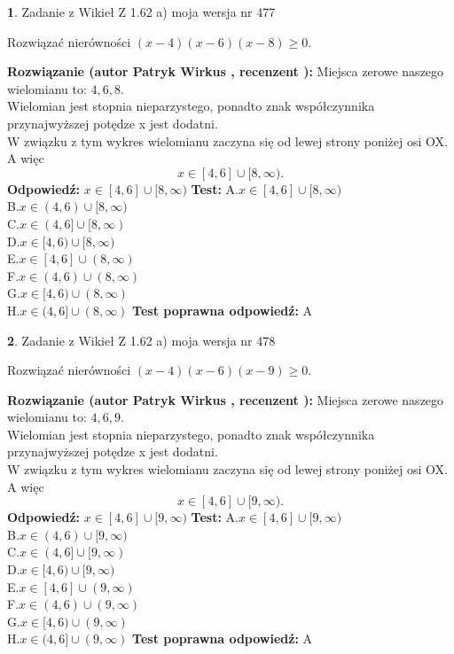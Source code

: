 \documentclass[12pt, a4paper]{article}
\theoremstyle{definition} %
\newtheorem{zad}{}
\newcommand{\zadStart}[1]{\begin{zad}#1\newline}
\newcommand{\zadStop}{\end{zad}}
\newcommand{\rozwStart}[2]{\noindent \textbf{Rozwiązanie (autor #1 , recenzent #2): }\newline}
\newcommand{\rozwStop}{\newline}
\newcommand{\odpStart}{\noindent \textbf{Odpowiedź:}\newline}
\newcommand{\odpStop}{\newline}
\newcommand{\testStart}{\noindent \textbf{Test:}\newline}
\newcommand{\testStop}{\newline}
\newcommand{\kluczStart}{\noindent \textbf{Test poprawna odpowiedź:}\newline}
\newcommand{\kluczStop}{\newline}
\begin{document}
\zadStart{Zadanie z Wikieł Z 1.62 a) moja wersja nr 477}

Rozwiązać nierówności $(x-4)(x-6)(x-8)\ge0$.
\zadStop
\rozwStart{Patryk Wirkus}{}
Miejsca zerowe naszego wielomianu to: $4, 6, 8$.\\
Wielomian jest stopnia nieparzystego, ponadto znak współczynnika przy\linebreak najwyższej potędze x jest dodatni.\\ W związku z tym wykres wielomianu zaczyna się od lewej strony poniżej osi OX. A więc $$x \in [4,6] \cup [8,\infty).$$
\rozwStop
\odpStart
$x \in [4,6] \cup [8,\infty)$
\odpStop
\testStart
A.$x \in [4,6] \cup [8,\infty)$\\
B.$x \in (4,6) \cup [8,\infty)$\\
C.$x \in (4,6] \cup [8,\infty)$\\
D.$x \in [4,6) \cup [8,\infty)$\\
E.$x \in [4,6] \cup (8,\infty)$\\
F.$x \in (4,6) \cup (8,\infty)$\\
G.$x \in [4,6) \cup (8,\infty)$\\
H.$x \in (4,6] \cup (8,\infty)$
\testStop
\kluczStart
A
\kluczStop



\zadStart{Zadanie z Wikieł Z 1.62 a) moja wersja nr 478}

Rozwiązać nierówności $(x-4)(x-6)(x-9)\ge0$.
\zadStop
\rozwStart{Patryk Wirkus}{}
Miejsca zerowe naszego wielomianu to: $4, 6, 9$.\\
Wielomian jest stopnia nieparzystego, ponadto znak współczynnika przy\linebreak najwyższej potędze x jest dodatni.\\ W związku z tym wykres wielomianu zaczyna się od lewej strony poniżej osi OX. A więc $$x \in [4,6] \cup [9,\infty).$$
\rozwStop
\odpStart
$x \in [4,6] \cup [9,\infty)$
\odpStop
\testStart
A.$x \in [4,6] \cup [9,\infty)$\\
B.$x \in (4,6) \cup [9,\infty)$\\
C.$x \in (4,6] \cup [9,\infty)$\\
D.$x \in [4,6) \cup [9,\infty)$\\
E.$x \in [4,6] \cup (9,\infty)$\\
F.$x \in (4,6) \cup (9,\infty)$\\
G.$x \in [4,6) \cup (9,\infty)$\\
H.$x \in (4,6] \cup (9,\infty)$
\testStop
\kluczStart
A
\kluczStop
\end{document}
